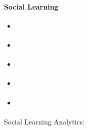 \documentclass[11pt]{article}
\begin{document}
\paragraph{Social Learning}
\begin{itemize}
  \item \cite{Shum2012}
  \item \cite{Ullmann2011}
  \item \cite{Haiming2012}
  \item \cite{Fournier2011}
  \item \cite{Ferguson2012b}
\end{itemize}

Social Learning Analytics:






\end{document}
